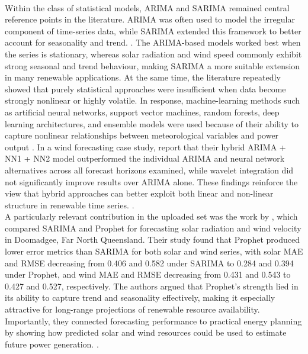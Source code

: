 \documentclass[conference]{IEEEtran}
\begin{document}
\\Within the class of statistical models, ARIMA and SARIMA remained central reference points in the literature. ARIMA was often used to model the irregular component of time-series data, while SARIMA extended this framework to better account for seasonality and trend. \cite{islam_forecasting_resources}. The ARIMA-based models worked best when the series is stationary, whereas solar radiation and wind speed commonly exhibit strong seasonal and trend behaviour, making SARIMA a more suitable extension in many renewable applications. At the same time, the literature repeatedly showed that purely statistical approaches were insufficient when data become strongly nonlinear or highly volatile. In response, machine-learning methods such as artificial neural networks, support vector machines, random forests, deep learning architectures, and ensemble models were used because of their ability to capture nonlinear relationships between meteorological variables and power output \cite{prema_review_forecast,chen_xu_china_data,kadampur_solar_case}. In a wind forecasting case study, report that their hybrid ARIMA + NN1 + NN2 model outperformed the individual ARIMA and neural network alternatives across all forecast horizons examined, while wavelet integration did not significantly improve results over ARIMA alone. These findings reinforce the view that hybrid approaches can better exploit both linear and non-linear structure in renewable time series. \cite{alencar_wind_forecasting}.
\\A particularly relevant contribution in the uploaded set was the work by \cite{islam_forecasting_resources}, which compared SARIMA and Prophet for forecasting solar radiation and wind velocity in Doomadgee, Far North Queensland. Their study found that Prophet produced lower error metrics than SARIMA for both solar and wind series, with solar MAE and RMSE decreasing from 0.406 and 0.582 under SARIMA to 0.284 and 0.394 under Prophet, and wind MAE and RMSE decreasing from 0.431 and 0.543 to 0.427 and 0.527, respectively. The authors argued that Prophet’s strength lied in its ability to capture trend and seasonality effectively, making it especially attractive for long-range projections of renewable resource availability. Importantly, they connected forecasting performance to practical energy planning by showing how predicted solar and wind resources could be used to estimate future power generation. \cite{islam_forecasting_resources}. 
\end{document}
